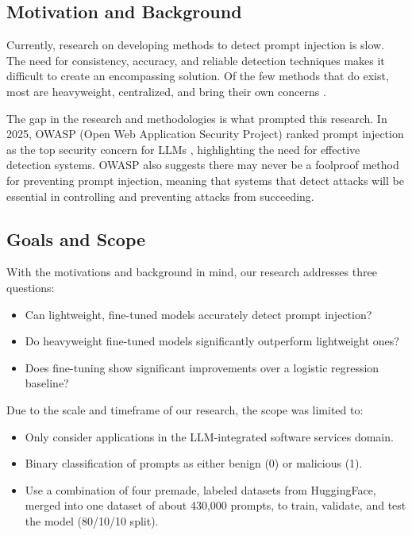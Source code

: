 \documentclass[12pt, letterpaper]{article}   %
\begin{document}
\subsection{Motivation and Background}

Currently, research on developing methods to detect prompt injection is slow. The need for consistency, accuracy, and reliable detection techniques makes it difficult to create an encompassing solution. Of the few methods that do exist, most are heavyweight, centralized, and bring their own concerns \cite{ref32}.

The gap in the research and methodologies is what prompted this research. In 2025, OWASP (Open Web Application Security Project) ranked prompt injection as the top security concern for LLMs \cite{ref14}, highlighting the need for effective detection systems. OWASP also suggests there may never be a foolproof method for preventing prompt injection, meaning that systems that detect attacks will be essential in controlling and preventing attacks from succeeding.

\subsection{Goals and Scope}

With the motivations and background in mind, our research addresses three questions:

\begin{itemize}
    \item Can lightweight, fine-tuned models accurately detect prompt injection? \cite{ref37}
    \item Do heavyweight fine-tuned models significantly outperform lightweight ones? \cite{ref13}
    \item Does fine-tuning show significant improvements over a logistic regression baseline? \cite{ref1}
\end{itemize}

Due to the scale and timeframe of our research, the scope was limited to:

\begin{itemize}
    \item Only consider applications in the LLM-integrated software services domain.
    \item Binary classification of prompts as either benign (0) or malicious (1).
    \item Use a combination of four premade, labeled datasets from HuggingFace, merged into one dataset of about 430,000 prompts, to train, validate, and test the model (80/10/10 split).
\end{itemize}
\end{document}
